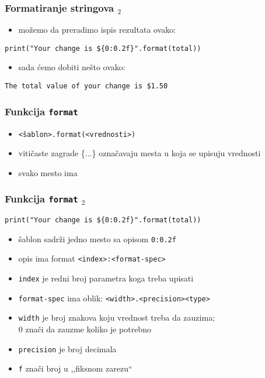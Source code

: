 \documentclass[utf8,compress,aspectratio=169]{beamer}
\begin{document}
\begin{frame}[fragile]
  \frametitle{Formatiranje stringova $_2$}
  \begin{itemize}
    \item možemo da preradimo ispis rezultata ovako:
  \end{itemize}
\begin{verbatim}
print("Your change is ${0:0.2f}".format(total))
\end{verbatim}
  \begin{itemize}
    \item sada ćemo dobiti nešto ovako:
  \end{itemize}
\begin{verbatim}
The total value of your change is $1.50
\end{verbatim}
\end{frame}

\begin{frame}[fragile]
  \frametitle{Funkcija \texttt{format}}
  \begin{itemize}
    \item \texttt{<šablon>.format(<vrednosti>)}
    \item vitičaste zagrade \{...\} označavaju mesta u koja se upisuju vrednosti
    \item svako mesto ima 
  \end{itemize}
\end{frame}

\begin{frame}[fragile]
  \frametitle{Funkcija \texttt{format} $_2$}
\begin{verbatim}
print("Your change is ${0:0.2f}".format(total))
\end{verbatim}
  \begin{itemize}
    \item šablon sadrži jedno mesto sa opisom \texttt{0:0.2f}
    \item opis ima format \texttt{<index>:<format-spec>}
    \item \texttt{index} je redni broj parametra koga treba upisati
    \item \texttt{format-spec} ima oblik: \texttt{<width>.<precision><type>}
    \item \texttt{width} je broj znakova koju vrednost treba da zauzima; \\0 znači da zauzme koliko je potrebno
    \item \texttt{precision} je broj decimala
    \item \texttt{f} znači broj u ,,fiksnom zarezu``
  \end{itemize}
\end{frame}
\end{document}
